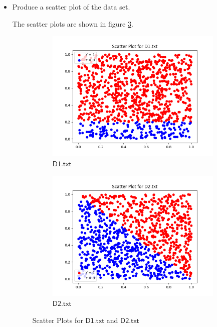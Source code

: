 \documentclass[a4paper]{article}
\theoremstyle{definition}
\newenvironment{soln}{
    \leavevmode\color{blue}\ignorespaces
}{}
\begin{document}
\begin{enumerate}
\begin{itemize}
  \item Produce a scatter plot of the data set.

  \begin{soln}
      The scatter plots are shown in figure \ref{fig:4}.

      \begin{figure}[H]
          \centering
          \begin{subfigure}{0.5\textwidth}
          \centering
          \includegraphics[width=1.1\linewidth]{Scatter_D_1.png}
          \caption{$\mathsf{D1.txt}$}
          \label{fig:3sub1}
        \end{subfigure}%
        \begin{subfigure}{0.5\textwidth}
          \centering
          \includegraphics[width=1.1\linewidth]{Scatter_D_2.png}
          \caption{$\mathsf{D2.txt}$}
          \label{fig:3sub2}
          \end{subfigure}
          \caption{Scatter Plots for $\mathsf{D1.txt}$ and $\mathsf{D2.txt}$}
          \label{fig:4}
      \end{figure}
  \end{soln}


\end{itemize}
\end{enumerate}
\end{document}
